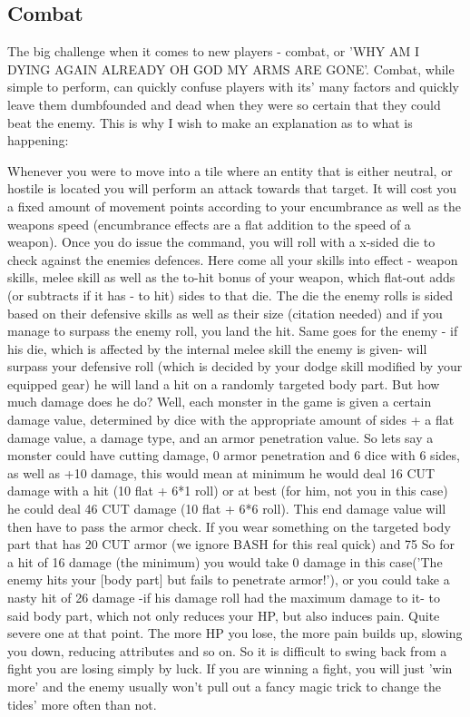 \documentclass[11pt]{report}
\begin{document}
\subsection{Combat}

The big challenge when it comes to new players - combat, or 'WHY AM I DYING AGAIN ALREADY OH GOD MY ARMS ARE GONE'.
Combat, while simple to perform, can quickly confuse players with its' many factors and quickly leave them dumbfounded and dead when they were so certain that they could beat the enemy. This is why I wish to make an explanation as to what is happening:

Whenever you were to move into a tile where an entity that is either neutral, or hostile is located you will perform an attack towards that target. It will cost you a fixed amount of movement points according to your encumbrance as well as the weapons speed (encumbrance effects are a flat addition to the speed of a weapon).
Once you do issue the command, you will roll with a x-sided die to check against the enemies defences. Here come all your skills into effect - weapon skills, melee skill as well as the to-hit bonus of your weapon, which flat-out adds (or subtracts if it has - to hit) sides to that die. The die the enemy rolls is sided based on their defensive skills as well as their size (citation needed) and if you manage to surpass the enemy roll, you land the hit.
Same goes for the enemy - if his die, which is affected by the internal melee skill the enemy is given- will surpass your defensive roll (which is decided by your dodge skill modified by your equipped gear) he will land a hit on a randomly targeted body part.
But how much damage does he do? Well, each monster in the game is given a certain damage value, determined by dice with the appropriate amount of sides + a flat damage value, a damage type, and an armor penetration value. So lets say a monster could have cutting damage, 0 armor penetration and 6 dice with 6 sides, as well as +10 damage, this would mean at minimum he would deal 16 CUT damage with a hit (10 flat + 6*1 roll) or at best (for him, not you in this case) he could deal 46 CUT damage (10 flat + 6*6 roll).
This end damage value will then have to pass the armor check. If you wear something on the targeted body part that has 20 CUT armor (we ignore BASH for this real quick) and 75%
So for a hit of 16 damage (the minimum) you would take 0 damage in this case('The enemy hits your [body part] but fails to penetrate armor!'), or you could take a nasty hit of 26 damage -if his damage roll had the maximum damage to it- to said body part, which not only reduces your HP, but also induces pain. Quite severe one at that point. The more HP you lose, the more pain builds up, slowing you down, reducing attributes and so on. So it is difficult to swing back from a fight you are losing simply by luck. If you are winning a fight, you will just 'win more' and the enemy usually won't pull out a fancy magic trick to change the tides' more often than not.
\end{document}
